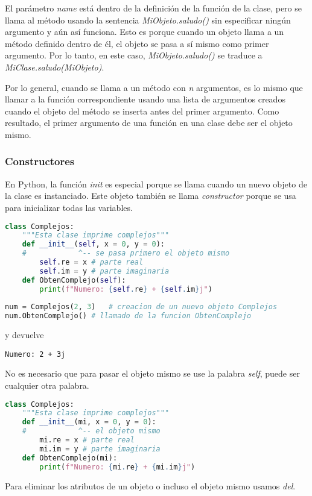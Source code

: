 	El parámetro \emph{name} está dentro de la definición de la función de la clase, pero se llama al método usando la sentencia \emph{MiObjeto.saludo()} sin especificar ningún argumento y aún así funciona. Esto es porque cuando un objeto llama a un método definido dentro de él, el objeto se pasa a sí mismo como primer argumento. Por lo tanto, en este caso, \emph{MiObjeto.saludo()} se traduce a \emph{MiClase.saludo(MiObjeto)}.\par
	Por lo general, cuando se llama a un método con \emph{n} argumentos, es lo mismo que llamar a la función correspondiente usando una lista de argumentos creados cuando el objeto del método se inserta antes del primer argumento. Como resultado, el primer argumento de una función en una clase debe ser el objeto mismo.
	\subsubsection{Constructores}
	En Python, la función \emph{\textunderscore\textunderscore init\textunderscore\textunderscore} es especial porque se llama cuando un nuevo objeto de la clase es instanciado. Este objeto también se llama \emph{constructor} porque se usa para inicializar todas las variables.
	\begin{lstlisting}[language = {python}]
class Complejos:
    """Esta clase imprime complejos"""
    def __init__(self, x = 0, y = 0):   
    #            ^-- se pasa primero el objeto mismo
        self.re = x # parte real
        self.im = y # parte imaginaria
    def ObtenComplejo(self):
        print(f"Numero: {self.re} + {self.im}j")
    
num = Complejos(2, 3)   # creacion de un nuevo objeto Complejos
num.ObtenComplejo() # llamado de la funcion ObtenComplejo
	\end{lstlisting} 
	y devuelve
	\begin{lstlisting}[language = {[latex]tex}]
Numero: 2 + 3j
	\end{lstlisting}
	No es necesario que para pasar el objeto mismo se use la palabra \emph{self}, puede ser cualquier otra palabra.
	\begin{lstlisting}[language = {python}]
class Complejos:
    """Esta clase imprime complejos"""
    def __init__(mi, x = 0, y = 0):   
    #            ^-- el objeto mismo
        mi.re = x # parte real
        mi.im = y # parte imaginaria
    def ObtenComplejo(mi):
        print(f"Numero: {mi.re} + {mi.im}j")
	\end{lstlisting} 
	Para eliminar los atributos de un objeto o incluso el objeto mismo usamos \emph{del}.
